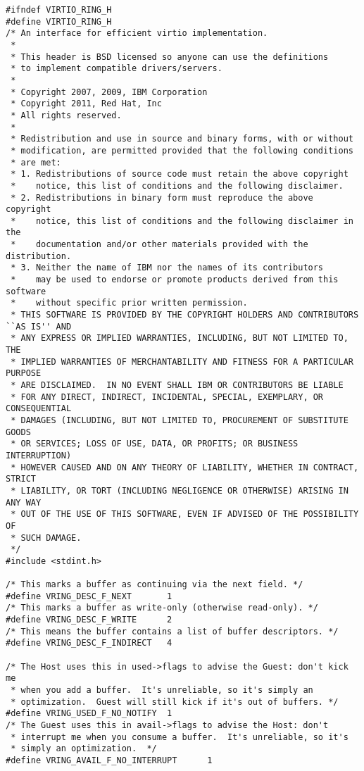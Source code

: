 \begin{lstlisting}
#ifndef VIRTIO_RING_H
#define VIRTIO_RING_H
/* An interface for efficient virtio implementation.
 *
 * This header is BSD licensed so anyone can use the definitions
 * to implement compatible drivers/servers.
 *
 * Copyright 2007, 2009, IBM Corporation
 * Copyright 2011, Red Hat, Inc
 * All rights reserved.
 *
 * Redistribution and use in source and binary forms, with or without
 * modification, are permitted provided that the following conditions
 * are met:
 * 1. Redistributions of source code must retain the above copyright
 *    notice, this list of conditions and the following disclaimer.
 * 2. Redistributions in binary form must reproduce the above copyright
 *    notice, this list of conditions and the following disclaimer in the
 *    documentation and/or other materials provided with the distribution.
 * 3. Neither the name of IBM nor the names of its contributors
 *    may be used to endorse or promote products derived from this software
 *    without specific prior written permission.
 * THIS SOFTWARE IS PROVIDED BY THE COPYRIGHT HOLDERS AND CONTRIBUTORS ``AS IS'' AND
 * ANY EXPRESS OR IMPLIED WARRANTIES, INCLUDING, BUT NOT LIMITED TO, THE
 * IMPLIED WARRANTIES OF MERCHANTABILITY AND FITNESS FOR A PARTICULAR PURPOSE
 * ARE DISCLAIMED.  IN NO EVENT SHALL IBM OR CONTRIBUTORS BE LIABLE
 * FOR ANY DIRECT, INDIRECT, INCIDENTAL, SPECIAL, EXEMPLARY, OR CONSEQUENTIAL
 * DAMAGES (INCLUDING, BUT NOT LIMITED TO, PROCUREMENT OF SUBSTITUTE GOODS
 * OR SERVICES; LOSS OF USE, DATA, OR PROFITS; OR BUSINESS INTERRUPTION)
 * HOWEVER CAUSED AND ON ANY THEORY OF LIABILITY, WHETHER IN CONTRACT, STRICT
 * LIABILITY, OR TORT (INCLUDING NEGLIGENCE OR OTHERWISE) ARISING IN ANY WAY
 * OUT OF THE USE OF THIS SOFTWARE, EVEN IF ADVISED OF THE POSSIBILITY OF
 * SUCH DAMAGE.
 */
#include <stdint.h>

/* This marks a buffer as continuing via the next field. */
#define VRING_DESC_F_NEXT       1
/* This marks a buffer as write-only (otherwise read-only). */
#define VRING_DESC_F_WRITE      2
/* This means the buffer contains a list of buffer descriptors. */
#define VRING_DESC_F_INDIRECT   4

/* The Host uses this in used->flags to advise the Guest: don't kick me
 * when you add a buffer.  It's unreliable, so it's simply an
 * optimization.  Guest will still kick if it's out of buffers. */
#define VRING_USED_F_NO_NOTIFY  1
/* The Guest uses this in avail->flags to advise the Host: don't
 * interrupt me when you consume a buffer.  It's unreliable, so it's
 * simply an optimization.  */
#define VRING_AVAIL_F_NO_INTERRUPT      1


\end{lstlisting}
